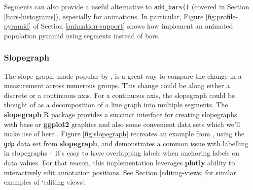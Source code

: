 \documentclass[
  12pt,
]{krantz}
\begin{document}
Segments can also provide a useful alternative to \texttt{add\_bars()} (covered in Section \ref{bars-histograms}), especially for animations. In particular, Figure \ref{fig:profile-pyramid} of Section \ref{animation-support} shows how implement an animated population pyramid using segments instead of bars.

\hypertarget{slopegraph}{%
\subsubsection{Slopegraph}\label{slopegraph}}

The slope graph, made popular by \citet{tufte2001}, is a great way to compare the change in a measurement across numerous groups. This change could be along either a discrete or a continuous axis. For a continuous axis, the slopegraph could be thought of as a decomposition of a line graph into multiple segments. The \textbf{slopegraph} R package provides a succinct interface for creating slopegraphs with base or \textbf{ggplot2} graphics and also some convenient data sets which we'll make use of here \citep{slopegraph}. Figure \ref{fig:slopegraph} recreates an example from \citet{tufte2001}, using the \texttt{gdp} data set from \textbf{slopegraph}, and demonstrates a common issue with labelling in slopegraphs -- it's easy to have overlapping labels when anchoring labels on data values. For that reason, this implementation leverages \textbf{plotly} ability to interactively edit annotation positions. See Section \ref{editing-views} for similar examples of `editing views'.
\end{document}
